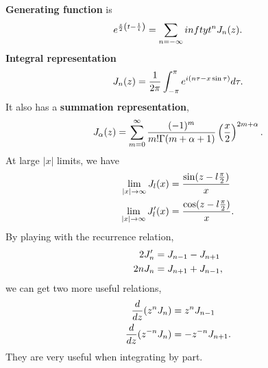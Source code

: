 \documentclass[letterpaper,10pt,english]{sphinxmanual}
\begin{document}
\textbf{Generating function} is
\begin{gather}
\begin{split}e^{\frac{z}{2}\left(t-\frac{1}{t}\right)} = \sum_{n=-\infty}{infty} t^n J_n(z) .\end{split}\notag
\end{gather}
\textbf{Integral representation}
\begin{gather}
\begin{split}J_n(z) = \frac{1}{2\pi} \int_{-\pi}^{\pi} e^{i(n\tau - x \sin \tau)} d\tau .\end{split}\notag
\end{gather}
It also has a \textbf{summation representation},
\begin{gather}
\begin{split}J_\alpha(z) = \sum_{m=0}^\infty \frac{(-1)^m}{m!\Gamma(m+\alpha +1)}  \left( \frac{x}{2} \right)^{2m+\alpha} .\end{split}\notag
\end{gather}
At large \(\vert x \vert\) limits, we have
\begin{gather}
\begin{split}\lim_{\vert x\vert \to \infty} J_l(x) &= \frac{\sin(z-l\frac{\pi}{2})}{x} \\
\lim_{\vert x\vert \to \infty} J_l'(x) &= \frac{\cos(z-l\frac{\pi}{2})}{x} .\end{split}\notag
\end{gather}
By playing with the recurrence relation,
\begin{gather}
\begin{split}2J_n' &= J_{n-1} - J_{n+1} \\
2n J_n & = J_{n+1} + J_{n-1},\end{split}\notag
\end{gather}
we can get two more useful relations,
\begin{gather}
\begin{split}\frac{d}{dz} (z^n J_n) & = z^n J_{n-1} \\
\frac{d}{dz} (z^{-n} J_{n}) & = - z^{-n} J_{n+1} .\end{split}\notag
\end{gather}
They are very useful when integrating by part.
\end{document}
